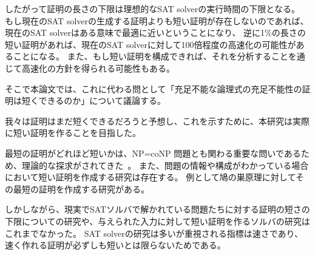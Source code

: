 \begin{comment}
さらに、短い証明を作ることは、ソルバの性能の限界に関する間接的な答えを与えることができる。
SAT solverは充足不能な命題に対して充足不能性の証明を与えるため、
\end{comment}
したがって証明の長さの下限は理想的なSAT solverの実行時間の下限となる。 
もし現在のSAT solverの生成する証明よりも短い証明が存在しないのであれば、
現在のSAT solverはある意味で最適に近いということになり、
逆に1\%の長さの短い証明があれば、現在のSAT solverに対して100倍程度の高速化の可能性があることになる。
また、もし短い証明を構成できれば、それを分析することを通じて高速化の方針を得られる可能性もある。

%
%

そこで本論文では、これに代わる問として「充足不能な論理式の充足不能性の証明は短くできるのか」について議論する。

我々は証明はまだ短くできるだろうと予想し、これを示すために、本研究は実際に短い証明を作ることを目指した。

最短の証明がどれほど短いかは、NP=coNP 問題とも関わる重要な問いであるため、理論的な探求がされてきた~\cite{proof}。
また、問題の情報や構成がわかっている場合において短い証明を作成する研究は存在する。
例として鳩の巣原理に対してその最短の証明を作成する研究\cite{pigeonhole}がある。

しかしながら、現実でSATソルバで解かれている問題たちに対する証明の短さの下限についての研究や、与えられた入力に対して短い証明を作るソルバの研究はこれまでなかった。
SAT solverの研究は多いが重視される指標は速さであり、速く作れる証明が必ずしも短いとは限らないためである。

